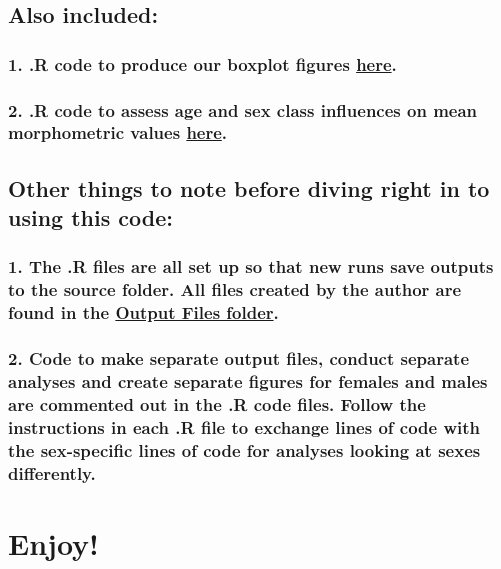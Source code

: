 \documentclass[]{article}
\begin{document}
\subsection{Also included:}\label{also-included}

\subsubsection{\texorpdfstring{1. .R code to produce our boxplot figures
\href{https://github.com/mmacphe/Tyrannus_morphology/blob/main/Boxplots_Figures.R}{here}.}{1. .R code to produce our boxplot figures here.}}\label{r-code-to-produce-our-boxplot-figures-here.}

\subsubsection{\texorpdfstring{2. .R code to assess age and sex class
influences on mean morphometric values
\href{https://github.com/mmacphe/Tyrannus_morphology/blob/main/LinearModels_Demographic_Influence.R}{here}.}{2. .R code to assess age and sex class influences on mean morphometric values here.}}\label{r-code-to-assess-age-and-sex-class-influences-on-mean-morphometric-values-here.}

\subsection{Other things to note before diving right in to using this
code:}\label{other-things-to-note-before-diving-right-in-to-using-this-code}

\subsubsection{\texorpdfstring{1. The .R files are all set up so that
new runs save outputs to the source folder. All files created by the
author are found in the
\href{https://github.com/mmacphe/Tyrannus_morphology/tree/main/Output\%20Files}{Output
Files
folder}.}{1. The .R files are all set up so that new runs save outputs to the source folder. All files created by the author are found in the Output Files folder.}}\label{the-.r-files-are-all-set-up-so-that-new-runs-save-outputs-to-the-source-folder.-all-files-created-by-the-author-are-found-in-the-output-files-folder.}

\subsubsection{2. Code to make separate output files, conduct separate
analyses and create separate figures for females and males are commented
out in the .R code files. Follow the instructions in each .R file to
exchange lines of code with the sex-specific lines of code for analyses
looking at sexes
differently.}\label{code-to-make-separate-output-files-conduct-separate-analyses-and-create-separate-figures-for-females-and-males-are-commented-out-in-the-.r-code-files.-follow-the-instructions-in-each-.r-file-to-exchange-lines-of-code-with-the-sex-specific-lines-of-code-for-analyses-looking-at-sexes-differently.}

\section{Enjoy!}\label{enjoy}
\end{document}
